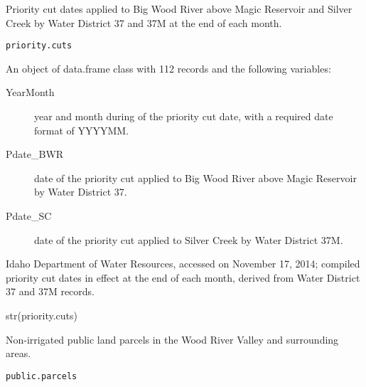 \documentclass[a4paper]{book}
\begin{document}
%
\begin{Description}\relax
Priority cut dates applied to Big Wood River above Magic Reservoir and
Silver Creek by Water District 37 and 37M at the end of each month.
\end{Description}
%
\begin{Usage}
\begin{verbatim}
priority.cuts
\end{verbatim}
\end{Usage}
%
\begin{Format}
An object of data.frame class with 112 records
and the following variables:
\begin{description}

\item[YearMonth] year and month during of the priority cut date,
with a required date format of YYYYMM.
\item[Pdate\_BWR] date of the priority cut applied to
Big Wood River above Magic Reservoir by Water District 37.
\item[Pdate\_SC] date of the priority cut applied to
Silver Creek by Water District 37M.

\end{description}

\end{Format}
%
\begin{Source}\relax
Idaho Department of Water Resources, accessed on November 17, 2014;
compiled priority cut dates in effect at the end of each month,
derived from Water District 37 and 37M records.
\end{Source}
%
\begin{Examples}
\begin{ExampleCode}
str(priority.cuts)

\end{ExampleCode}
\end{Examples}
%
\begin{Description}\relax
Non-irrigated public land parcels in the Wood River Valley and surrounding areas.
\end{Description}
%
\begin{Usage}
\begin{verbatim}
public.parcels
\end{verbatim}
\end{Usage}
\end{document}
